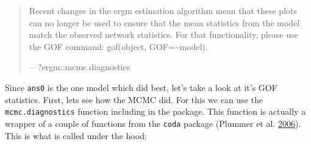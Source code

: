 \documentclass[]{book}
\theoremstyle{definition}
\theoremstyle{definition}
\theoremstyle{definition}
\theoremstyle{remark}
\begin{document}
\begin{quote}
Recent changes in the ergm estimation algorithm mean that these plots
can no longer be used to ensure that the mean statistics from the model
match the observed network statistics. For that functionality, please
use the GOF command: gof(object, GOF=\textasciitilde{}model).

---?ergm::mcmc.diagnostics
\end{quote}

Since \texttt{ans0} is the one model which did best, let's take a look
at it's GOF statistics. First, lets see how the MCMC did. For this we
can use the \texttt{mcmc.diagnostics} function including in the package.
This function is actually a wrapper of a couple of functions from the
\texttt{coda} package (Plummer et al.
\protect\hyperlink{ref-R-coda}{2006}). This is what is called under the
hood:
\end{document}
